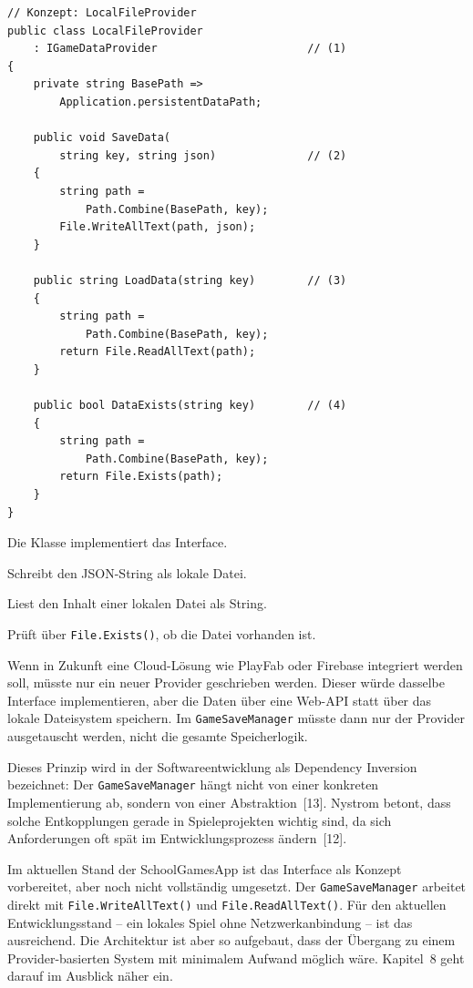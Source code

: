 \documentclass[12pt,a4paper]{article}
\begin{document}
\begin{lstlisting}
// Konzept: LocalFileProvider
public class LocalFileProvider
    : IGameDataProvider                       // (1)
{
    private string BasePath =>
        Application.persistentDataPath;

    public void SaveData(
        string key, string json)              // (2)
    {
        string path =
            Path.Combine(BasePath, key);
        File.WriteAllText(path, json);
    }

    public string LoadData(string key)        // (3)
    {
        string path =
            Path.Combine(BasePath, key);
        return File.ReadAllText(path);
    }

    public bool DataExists(string key)        // (4)
    {
        string path =
            Path.Combine(BasePath, key);
        return File.Exists(path);
    }
}
\end{lstlisting}

\begin{description}[leftmargin=2em, labelwidth=1.5em]
    \item[(1)] Die Klasse implementiert das Interface.
    \item[(2)] Schreibt den JSON-String als lokale Datei.
    \item[(3)] Liest den Inhalt einer lokalen Datei als String.
    \item[(4)] Prüft über \texttt{File.Exists()}, ob die Datei vorhanden ist.
\end{description}

Wenn in Zukunft eine Cloud-Lösung wie PlayFab oder Firebase integriert werden soll, müsste nur ein neuer Provider geschrieben werden. Dieser würde dasselbe Interface implementieren, aber die Daten über eine Web-API statt über das lokale Dateisystem speichern. Im \texttt{GameSaveManager} müsste dann nur der Provider ausgetauscht werden, nicht die gesamte Speicherlogik.

Dieses Prinzip wird in der Softwareentwicklung als Dependency Inversion bezeichnet: Der \texttt{GameSaveManager} hängt nicht von einer konkreten Implementierung ab, sondern von einer Abstraktion~[13]. Nystrom betont, dass solche Entkopplungen gerade in Spieleprojekten wichtig sind, da sich Anforderungen oft spät im Entwicklungsprozess ändern~[12].

Im aktuellen Stand der SchoolGamesApp ist das Interface als Konzept vorbereitet, aber noch nicht vollständig umgesetzt. Der \texttt{GameSaveManager} arbeitet direkt mit \texttt{File.WriteAllText()} und \texttt{File.ReadAllText()}. Für den aktuellen Entwicklungsstand -- ein lokales Spiel ohne Netzwerkanbindung -- ist das ausreichend. Die Architektur ist aber so aufgebaut, dass der Übergang zu einem Provider-basierten System mit minimalem Aufwand möglich wäre. Kapitel~8 geht darauf im Ausblick näher ein.
\end{document}
